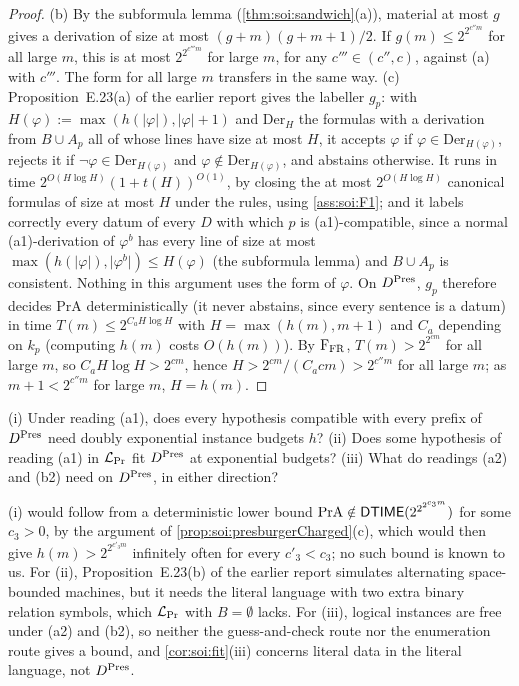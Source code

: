\begin{proof}
(b) By the subformula lemma (\cref{thm:soi:sandwich}(a)), material at most $g$ gives a derivation of size at most $(g+m)(g+m+1)/2$. If $g(m)\le2^{2^{c''m}}$ for all large $m$, this is at most $2^{2^{c'''m}}$ for large $m$, for any $c'''\in(c'',c)$, against (a) with $c'''$. The form for all large $m$ transfers in the same way.
(c) Proposition~E.23(a) of the earlier report gives the labeller $g_p$: with $H(\varphi):=\max(h(\lvert\varphi\rvert),\lvert\varphi\rvert+1)$ and $\mathrm{Der}_H$ the formulas with a derivation from $B\cup A_p$ all of whose lines have size at most $H$, it accepts $\varphi$ if $\varphi\in\mathrm{Der}_{H(\varphi)}$, rejects it if $\neg\varphi\in\mathrm{Der}_{H(\varphi)}$ and $\varphi\notin\mathrm{Der}_{H(\varphi)}$, and abstains otherwise. It runs in time $2^{O(H\log H)}(1+t(H))^{O(1)}$, by closing the at most $2^{O(H\log H)}$ canonical formulas of size at most $H$ under the rules, using \cref{ass:soi:F1}; and it labels correctly every datum of every $D$ with which $p$ is (a1)-compatible, since a normal (a1)-derivation of $\varphi^b$ has every line of size at most $\max(h(\lvert\varphi\rvert),\lvert\varphi^b\rvert)\le H(\varphi)$ (the subformula lemma) and $B\cup A_p$ is consistent. Nothing in this argument uses the form of $\varphi$. On $D^{\rm Pres}$, $g_p$ therefore decides $\mathrm{PrA}$ deterministically (it never abstains, since every sentence is a datum) in time $T(m)\le2^{C_aH\log H}$ with $H=\max(h(m),m+1)$ and $C_a$ depending on $k_p$ (computing $h(m)$ costs $O(h(m))$). By $\mathrm F_{\rm FR}$, $T(m)>2^{2^{cm}}$ for all large $m$, so $C_aH\log H>2^{cm}$, hence $H>2^{cm}/(C_acm)>2^{c''m}$ for all large $m$; as $m+1<2^{c''m}$ for large $m$, $H=h(m)$.
\end{proof}

\begin{question}\label{q:soi:presburger}
(i) Under reading (a1), does every hypothesis compatible with every prefix of $D^{\rm Pres}$ need doubly exponential instance budgets $h$? (ii) Does some hypothesis of reading (a1) in $\mathcal L_{\rm Pr}$ fit $D^{\rm Pres}$ at exponential budgets? (iii) What do readings (a2) and (b2) need on $D^{\rm Pres}$, in either direction?
\end{question}

(i) would follow from a deterministic lower bound $\mathrm{PrA}\notin\mathsf{DTIME}(2^{2^{2^{c_3m}}})$ for some $c_3>0$, by the argument of \cref{prop:soi:presburgerCharged}(c), which would then give $h(m)>2^{2^{c'_3m}}$ infinitely often for every $c'_3<c_3$; no such bound is known to us. For (ii), Proposition~E.23(b) of the earlier report simulates alternating space-bounded machines, but it needs the literal language with two extra binary relation symbols, which $\mathcal L_{\rm Pr}$ with $B=\emptyset$ lacks. For (iii), logical instances are free under (a2) and (b2), so neither the guess-and-check route nor the enumeration route gives a bound, and \cref{cor:soi:fit}(iii) concerns literal data in the literal language, not $D^{\rm Pres}$.

